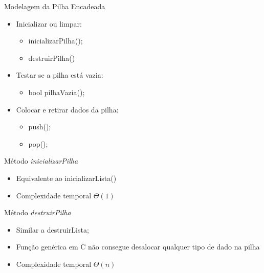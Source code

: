 \documentclass[12pt,table,xcolor={dvipsnames}]{beamer}
\begin{document}
\begin{frame}[fragile]{Modelagem da Pilha Encadeada}

\begin{itemize}
\item Inicializar ou limpar:
\begin{itemize}
\item inicializarPilha();
\item destruirPilha()
\end{itemize}
\item Testar se a pilha está vazia:
\begin{itemize}
\item bool pilhaVazia();
\end{itemize}
\item Colocar e retirar dados da pilha:
\begin{itemize}
\item push();
\item pop();
\end{itemize}
\end{itemize}
\end{frame}

\begin{frame}[fragile]{Método \textit{inicializarPilha}}
	\begin{itemize}
		\item Equivalente ao inicializarLista()
		\item Complexidade temporal $\Theta(1)$
	\end{itemize}
\end{frame}

\begin{frame}[fragile]{Método \textit{destruirPilha}}
	\begin{itemize}
		\item Similar a destruirLista;
		\item Função genérica em C não consegue desalocar qualquer tipo de dado na pilha
		\item Complexidade temporal $\Theta(n)$
	\end{itemize}
\end{frame}
\end{document}

